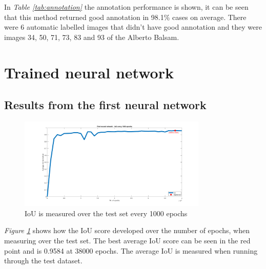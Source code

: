 \begin{table}[h]
\caption{Annotation on the automatically generated dataset with one object in the bin }
\label{tab:annotation}
\end{table}

In \textit{Table \ref{tab:annotation}} the annotation performance is shown, it can be seen that this method returned good annotation in 98.1\% cases on average. There were 6 automatic labelled images that didn’t have good annotation and they were images 34, 50, 71, 73, 83 and 93 of the Alberto Balsam.
\clearpage
\section{Trained neural network}
\subsection{Results from the first neural network} \label{sec:firstneural}
\begin{figure}[h]
    \centering
    \includegraphics[width=0.8\textwidth, trim={5cm 0 4cm 0},clip]{graphics/results/neuralnetworkauto.png}
    \caption{IoU is measured over the test set every 1000 epochs}
    \label{fig:neuralnetwork}
\end{figure}
\textit{Figure \ref{fig:neuralnetwork}} shows how the IoU score developed over the number of epochs, when measuring over the test set. The best average IoU score can be seen in the red point and is 0.9584 at 38000 epochs. The average IoU is measured when running through the test dataset.


